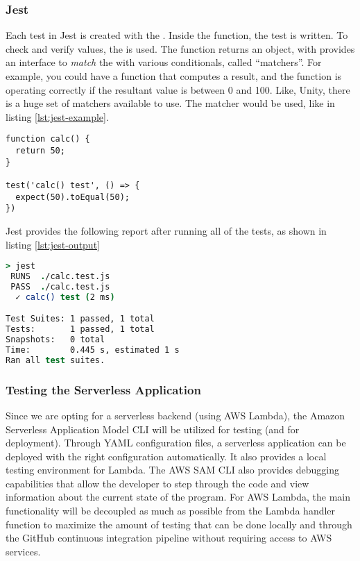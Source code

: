 \subsubsection{Jest}
Each test in Jest is created with the . Inside
the  function, the test is written. To check and verify values,
the  is used. The  function returns an
 object, with provides an interface to \emph{match} the
 with various conditionals, called ``matchers''. For example, you
could have a function that computes a result, and the function is operating
correctly if the resultant value is between 0 and 100. Like, Unity, there is
a huge set of matchers available to use. The 
matcher would be used, like in listing \ref{lst:jest-example}.

\begin{lstlisting}[style=ES6, label=lst:jest-example, caption={Jest Unit Testing Example}]
function calc() {
  return 50;
}

test('calc() test', () => {
  expect(50).toEqual(50);
})
\end{lstlisting}

Jest provides the following report after running all of the tests, as shown in
listing \ref{lst:jest-output}

\begin{lstlisting}[language=csh, label=lst:jest-output, caption={Jest Unit
Testing Example Output}]
> jest
 RUNS  ./calc.test.js
 PASS  ./calc.test.js
  ✓ calc() test (2 ms)

Test Suites: 1 passed, 1 total
Tests:       1 passed, 1 total
Snapshots:   0 total
Time:        0.445 s, estimated 1 s
Ran all test suites.
\end{lstlisting}

\subsubsection{Testing the Serverless Application}
Since we are opting for a serverless backend (using AWS Lambda),
the Amazon Serverless Application Model CLI will be utilized for testing (and
for deployment). Through YAML configuration files, a serverless application can
be deployed with the right configuration automatically. It also provides a local
testing environment for Lambda. The AWS SAM CLI also provides debugging
capabilities that allow the developer to step through the code and view
information about the current state of the program. For AWS Lambda, the main
functionality will be decoupled as much as possible from the Lambda handler
function to maximize the amount of testing that can be done locally and through
the GitHub continuous integration pipeline without requiring access to AWS
services.
